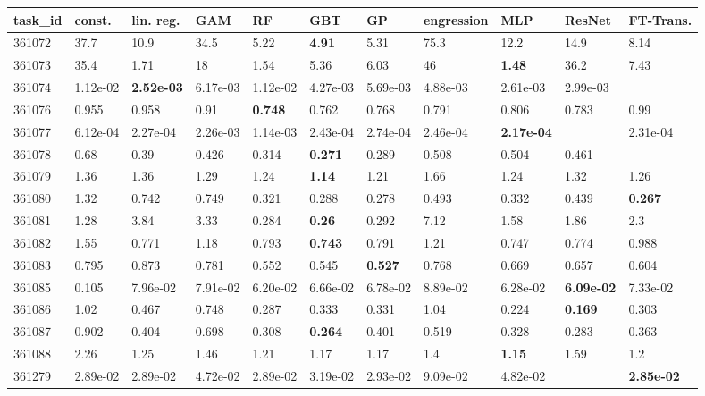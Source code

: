 \begin{table}[ht!]
\centering
\begingroup\footnotesize
\begin{tabular}{lllllllllll}
  \hline
\hline
task\_id & const. & lin. reg. & GAM & RF & GBT & GP & engression & MLP & ResNet & FT-Trans. \\ 
  \hline
361072 & 37.7 & 10.9 & 34.5 & 5.22 & \textbf{4.91} & 5.31 & 75.3 & 12.2 & 14.9 & 8.14 \\ 
  361073 & 35.4 & 1.71 & 18 & 1.54 & 5.36 & 6.03 & 46 & \textbf{1.48} & 36.2 & 7.43 \\ 
  361074 & 1.12e-02 & \textbf{2.52e-03} & 6.17e-03 & 1.12e-02 & 4.27e-03 & 5.69e-03 & 4.88e-03 & 2.61e-03 & 2.99e-03 &  \\ 
  361076 & 0.955 & 0.958 & 0.91 & \textbf{0.748} & 0.762 & 0.768 & 0.791 & 0.806 & 0.783 & 0.99 \\ 
  361077 & 6.12e-04 & 2.27e-04 & 2.26e-03 & 1.14e-03 & 2.43e-04 & 2.74e-04 & 2.46e-04 & \textbf{2.17e-04} &  & 2.31e-04 \\ 
  361078 & 0.68 & 0.39 & 0.426 & 0.314 & \textbf{0.271} & 0.289 & 0.508 & 0.504 & 0.461 &  \\ 
  361079 & 1.36 & 1.36 & 1.29 & 1.24 & \textbf{1.14} & 1.21 & 1.66 & 1.24 & 1.32 & 1.26 \\ 
  361080 & 1.32 & 0.742 & 0.749 & 0.321 & 0.288 & 0.278 & 0.493 & 0.332 & 0.439 & \textbf{0.267} \\ 
  361081 & 1.28 & 3.84 & 3.33 & 0.284 & \textbf{0.26} & 0.292 & 7.12 & 1.58 & 1.86 & 2.3 \\ 
  361082 & 1.55 & 0.771 & 1.18 & 0.793 & \textbf{0.743} & 0.791 & 1.21 & 0.747 & 0.774 & 0.988 \\ 
  361083 & 0.795 & 0.873 & 0.781 & 0.552 & 0.545 & \textbf{0.527} & 0.768 & 0.669 & 0.657 & 0.604 \\ 
  361085 & 0.105 & 7.96e-02 & 7.91e-02 & 6.20e-02 & 6.66e-02 & 6.78e-02 & 8.89e-02 & 6.28e-02 & \textbf{6.09e-02} & 7.33e-02 \\ 
  361086 & 1.02 & 0.467 & 0.748 & 0.287 & 0.333 & 0.331 & 1.04 & 0.224 & \textbf{0.169} & 0.303 \\ 
  361087 & 0.902 & 0.404 & 0.698 & 0.308 & \textbf{0.264} & 0.401 & 0.519 & 0.328 & 0.283 & 0.363 \\ 
  361088 & 2.26 & 1.25 & 1.46 & 1.21 & 1.17 & 1.17 & 1.4 & \textbf{1.15} & 1.59 & 1.2 \\ 
  361279 & 2.89e-02 & 2.89e-02 & 4.72e-02 & 2.89e-02 & 3.19e-02 & 2.93e-02 & 9.09e-02 & 4.82e-02 &  & \textbf{2.85e-02} \\ 

\end{tabular}
\end{table}
